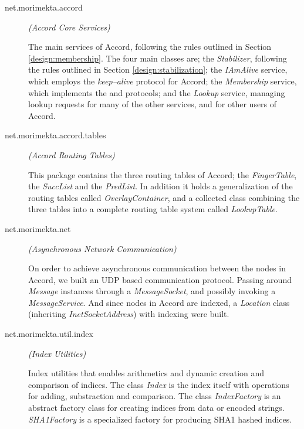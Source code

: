 \begin{small}
\renewcommand{\descriptionlabel}[1]%
  {\hspace{\labelsep}\normalsize\tt{#1}}
\begin{description}
\item[net.morimekta.accord] {\em (Accord Core Services)}

     The main services of Accord, following the rules outlined in Section \ref{design:membership}.
  The four main classes are;
  the \emph{Stabilizer}, following the rules outlined in Section \ref{design:stabilization};
  the \emph{I\-Am\-Alive} service, which employs the \emph{keep--alive} protocol for Accord;
  the \emph{Member\-ship} service, which implements the  and  protocols;
  and the \emph{Lookup} service, managing lookup requests for many of the other services, and
  for other users of Accord.

\item[net.morimekta.accord.tables] {\em (Accord Routing Tables)}

     This package contains the three routing tables of Accord; the \emph{Finger\-Table},
  the \emph{Succ\-List} and the \emph{Pred\-List}. In addition it holds a generalization
  of the routing tables called \emph{Overlay\-Container}, and a collected class combining
  the three tables into a complete routing table system called \emph{Lookup\-Table}.

\item[net.morimekta.net] {\em (Asynchronous Network Communication)}

     On order to achieve asynchronous communication between the nodes in Accord,
  we built an  UDP\cite{udp} based communication protocol. Passing around
  \emph{Message} instances through a \emph{Message\-Socket}, and possibly invoking a
  \emph{Message\-Service}. And
  since nodes in Accord are indexed, a \emph{Location} class (inheriting
  \emph{Inet\-Socket\-Address}) with indexing were built.

\item[net.morimekta.util.index] {\em (Index Utilities)}

   Index utilities that enables arithmetics and dynamic creation and comparison of
  indices. The class \emph{Index} is the index itself with operations for adding, substraction
  and comparison. The class \emph{Index\-Factory} is an abstract factory class for creating indices
  from data or encoded strings. \emph{SHA1\-Factory} is a specialized factory for producing
  SHA1 hashed indices.


\end{description}
\end{small}
